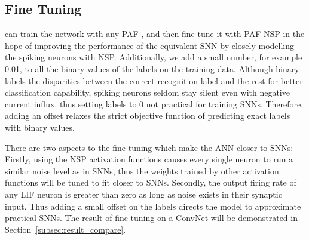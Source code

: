 	\subsection{Fine Tuning}
	\DIFdelbegin {}\DIFdelend \DIFaddbegin \label{subsec:finetune}
	\DIFaddend can train the network with any PAF \DIFdelbegin {}\DIFdelend \DIFaddbegin {}\DIFaddend , and then fine-tune it with PAF-NSP in the hope of improving the performance of the equivalent SNN by closely modelling the spiking neurons with NSP.
	Additionally, we add a small number, for example 0.01, to all the binary values of the labels on the training data.
	Although binary labels \DIFdelbegin {}\DIFdelend \DIFaddbegin {}\DIFaddend the disparities between the correct recognition label and the rest for better classification capability, 
	spiking neurons seldom stay silent even with negative current influx, thus setting labels to 0 \DIFdelbegin {}\DIFdelend \DIFaddbegin {}\DIFaddend not practical for training SNNs.
	Therefore, adding an offset relaxes the strict objective function of predicting exact labels with binary values.

	
	There are two aspects to the fine tuning which make the ANN closer to SNNs:
	Firstly, using the NSP activation functions causes every single neuron to run \DIFdelbegin {}\DIFdelend \DIFaddbegin {}\DIFaddend a similar noise level as in SNNs, thus the weights trained by other activation functions will be tuned to fit closer to SNNs.
	Secondly, the output firing rate of any LIF neuron is greater than zero as long as noise exists in their synaptic input.
	Thus adding \DIFdelbegin {}\DIFdelend a small offset on the labels directs the model to approximate practical SNNs. 
	The result of fine tuning on a ConvNet will be demonstrated in Section~\ref{subsec:result_compare}.

